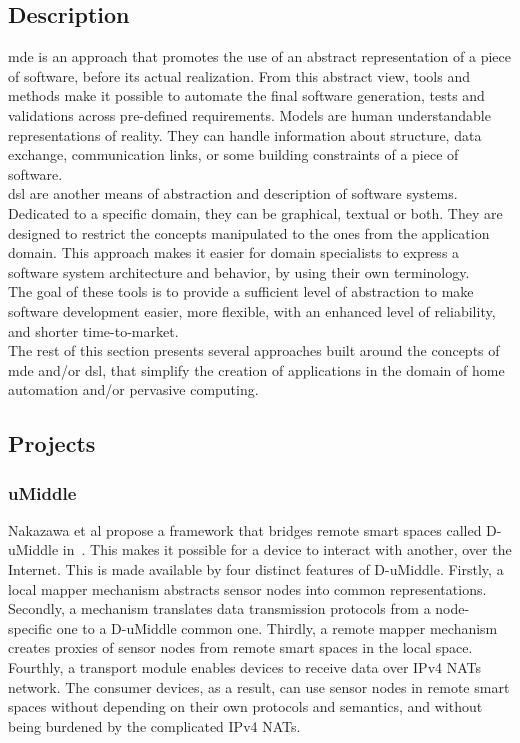 \subsection{Description}
\label{sec:mdeEtDSL}


\gls{mde} is an approach that promotes the use of an abstract representation of a piece of software, before its actual realization. From this abstract view, tools and methods make it possible to automate the final software generation, tests and validations across pre-defined requirements. Models are human understandable representations of reality. They can handle information about structure, data exchange, communication links, or some building constraints of a piece of software.\\
\gls{dsl} are another means of abstraction and description of software systems. Dedicated to a specific domain, they can be graphical, textual or both. They are designed to restrict the concepts manipulated to the ones from the application domain. This approach makes it easier for domain specialists to express a software system architecture and behavior, by using their own terminology.\\

The goal of these tools is to provide a sufficient level of abstraction to make software development easier, more flexible, with an enhanced level of reliability, and shorter time-to-market.\\
The rest of this section presents several approaches built around the concepts of \gls{mde} and/or \gls{dsl}, that simplify the creation of applications in the domain of home automation and/or pervasive computing.\\


\subsection{Projects}

\subsubsection{uMiddle}
Nakazawa et al propose a framework that bridges remote smart spaces called D-uMiddle in~\cite{Nakazawa:2007}. This makes it possible for a device to interact with another, over the Internet. This is made available by four distinct features of D-uMiddle. Firstly, a local mapper mechanism abstracts sensor nodes into common representations. Secondly, a mechanism translates data transmission protocols from a node-specific one to a D-uMiddle common one. Thirdly, a remote mapper mechanism creates proxies of sensor nodes from remote smart spaces in the local space. Fourthly, a transport module enables devices to receive data over IPv4 NATs network. The consumer devices, as a result, can use sensor nodes in remote smart spaces without depending on their own protocols and semantics, and without being burdened by the complicated IPv4 NATs.\\

